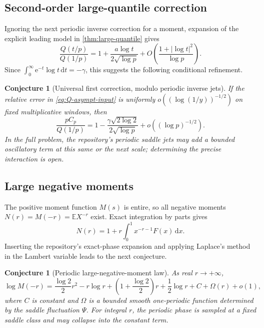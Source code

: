 \documentclass[11pt,oneside]{article}
\newtheorem{conjecture}[theorem]{Conjecture}
\theoremstyle{definition}
\theoremstyle{remark}
\newcommand{\E}{\mathbb E}
\newcommand{\dd}{\,\mathrm d}
\newcommand{\e}{\mathrm e}
\newcommand{\1}{\mathbf 1}
\begin{document}
\subsection{Second-order large-quantile correction}
Ignoring the next periodic inverse correction for a moment, expansion of the
explicit leading model in \cref{thm:large-quantile} gives
\[
 \frac{Q(t/p)}{Q(1/p)}
 =1+\frac{a\log t}{2\sqrt{\log p}}+O\!\left(\frac{1+|\log t|^2}{\log p}\right).
\]
Since \(\int_0^\infty\e^{-t}\log t\dd t=-\gamma\), this suggests the
following conditional refinement.

\begin{conjecture}[Universal first correction, modulo periodic inverse jets]
\label{conj:quantile-second}
If the relative error in \eqref{eq:Q-asympt-input} is uniformly
\(o((\log(1/y))^{-1/2})\) on fixed multiplicative windows, then
\begin{equation}
 \frac{pC_p}{Q(1/p)}
 =1-\frac{\gamma\sqrt{2\log2}}{2\sqrt{\log p}}
 +o((\log p)^{-1/2}).                                         \label{eq:conj-quantile-second}
\end{equation}
In the full problem, the repository's periodic saddle jets may add a bounded
oscillatory term at this same or the next scale; determining the precise
interaction is open.
\end{conjecture}

\subsection{Large negative moments}
The positive moment function \(M(s)\) is entire, so all negative moments
\(N(r)=M(-r)=\E X^{-r}\) exist.  Exact integration by parts gives
\begin{equation}
 N(r)=1+r\int_0^1x^{-r-1}F(x)\dd x.                            \label{eq:negative-moment-exact}
\end{equation}
Inserting the repository's exact-phase expansion and applying Laplace's method
in the Lambert variable leads to the next conjecture.

\begin{conjecture}[Periodic large-negative-moment law]\label{conj:negative-moments}
As real \(r\to+\infty\),
\begin{equation}
 \log M(-r)
 =\frac{\log2}{2}r^2-r\log r
 +\left(1+\frac{\log2}{2}\right)r
 +\frac12\log r+C+\Omega(r)+o(1),                              \label{eq:conj-negative-moment}
\end{equation}
where \(C\) is constant and \(\Omega\) is a bounded smooth one-periodic
function determined by the saddle fluctuation \(\Psi\).  For integral \(r\),
the periodic phase is sampled at a fixed saddle class and may collapse into
the constant term.
\end{conjecture}
\end{document}
